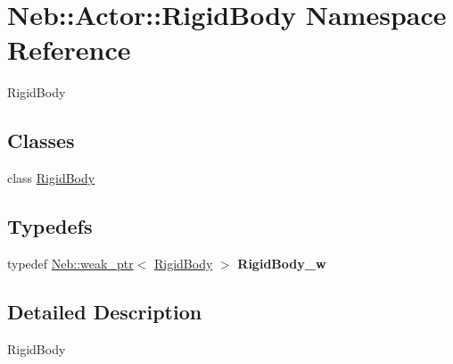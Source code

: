 \hypertarget{namespaceNeb_1_1Actor_1_1RigidBody}{\section{\-Neb\-:\-:\-Actor\-:\-:\-Rigid\-Body \-Namespace \-Reference}
\label{namespaceNeb_1_1Actor_1_1RigidBody}
}


\-Rigid\-Body  


\subsection*{\-Classes}
\begin{DoxyCompactItemize}
\item 
class \hyperlink{classNeb_1_1Actor_1_1RigidBody_1_1RigidBody}{\-Rigid\-Body}
\end{DoxyCompactItemize}
\subsection*{\-Typedefs}
\begin{DoxyCompactItemize}
\item 
\hypertarget{namespaceNeb_1_1Actor_1_1RigidBody_a087dda92729a55038d2f20d970b3c133}{typedef \hyperlink{classNeb_1_1weak__ptr}{\-Neb\-::weak\-\_\-ptr}$<$ \hyperlink{classNeb_1_1Actor_1_1RigidBody_1_1RigidBody}{\-Rigid\-Body} $>$ {\bfseries \-Rigid\-Body\-\_\-w}}\label{namespaceNeb_1_1Actor_1_1RigidBody_a087dda92729a55038d2f20d970b3c133}

\end{DoxyCompactItemize}


\subsection{\-Detailed \-Description}
\-Rigid\-Body 